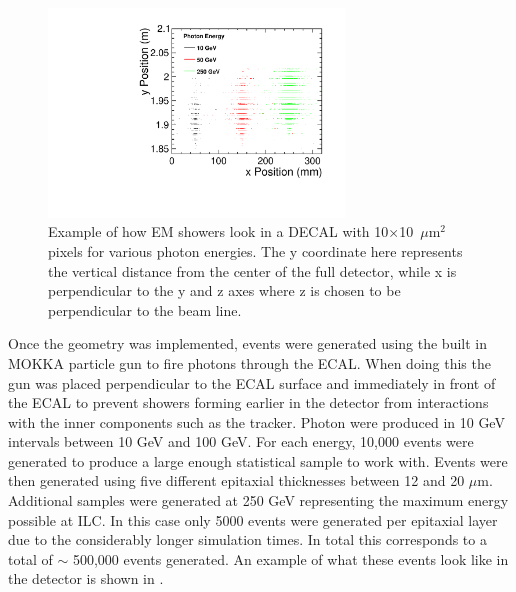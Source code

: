 \begin{figure}
  \centering
  \includegraphics[width=0.7\textwidth,keepaspectratio]{DECALStudies/fig/ExampleEvents}
  \caption[Example of how EM showers look in a \ac{DECAL} with 10$\times$10~$\mu$m$^2$ pixels for various photon energies.]{Example of how EM showers look in a \ac{DECAL} with 10$\times$10~$\mu$m$^2$ pixels for various photon energies. The y coordinate here represents the vertical distance from the center of the full detector, while x is perpendicular to the y and z axes where z is chosen to be perpendicular to the beam line.}
  \label{fig:exampleevents}
\end{figure}

Once the geometry was implemented, events were generated using the built in MOKKA particle gun to fire photons through the \ac{ECAL}. When doing this the gun was placed perpendicular to the \ac{ECAL} surface and immediately in front of the \ac{ECAL} to prevent showers forming earlier in the detector from interactions with the inner components such as the tracker. Photon were produced in 10 GeV intervals between 10 GeV and 100 GeV. For each energy, 10,000 events were generated to produce a large enough statistical sample to work with. Events were then generated using five different epitaxial thicknesses between 12 and 20 $\mu$m. Additional samples were generated at 250 GeV representing the maximum energy possible at \ac{ILC}. In this case only 5000 events were generated per epitaxial layer due to the considerably longer simulation times. In total this corresponds to a total of $\sim$ 500,000 events generated. An example of what these events look like in the detector is shown in .

